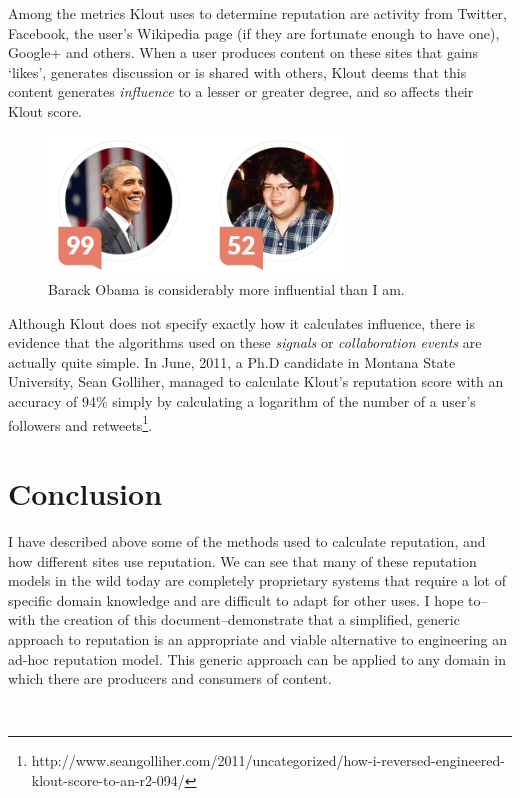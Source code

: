 \documentclass[]{final_report}
\begin{document}
Among the metrics Klout uses to determine reputation are activity from Twitter, Facebook, the user's Wikipedia page (if they are fortunate enough to have one), Google+ and others. When a user produces content on these sites that gains `likes', generates discussion or is shared with others, Klout deems that this content generates \textsl{influence} to a lesser or greater degree, and so affects their Klout score.

\begin{figure}[ht!]
\centering
\includegraphics[width=80mm]{klout.png}
\caption{Barack Obama is considerably more influential than I am.}
\end{figure}

Although Klout does not specify exactly how it calculates influence, there is evidence that the algorithms used on these \textsl{signals} or \textsl{collaboration events} are actually quite simple. In June, 2011, a Ph.D candidate in Montana State University, Sean Golliher, managed to calculate Klout's reputation score with an accuracy of 94\% simply by calculating a logarithm of the number of a user's followers and retweets\footnote{http://www.seangolliher.com/2011/uncategorized/how-i-reversed-engineered-klout-score-to-an-r2-094/}.

\section{Conclusion}

I have described above some of the methods used to calculate reputation, and how different sites use reputation. We can see that many of these reputation models in the wild today are completely proprietary systems that require a lot of specific domain knowledge and are difficult to adapt for other uses. I hope to--with the creation of this document--demonstrate that a simplified, generic approach to reputation is an appropriate and viable alternative to engineering an ad-hoc reputation model. This generic approach can be applied to any domain in which there are producers and consumers of content.

\ %
\end{document}
